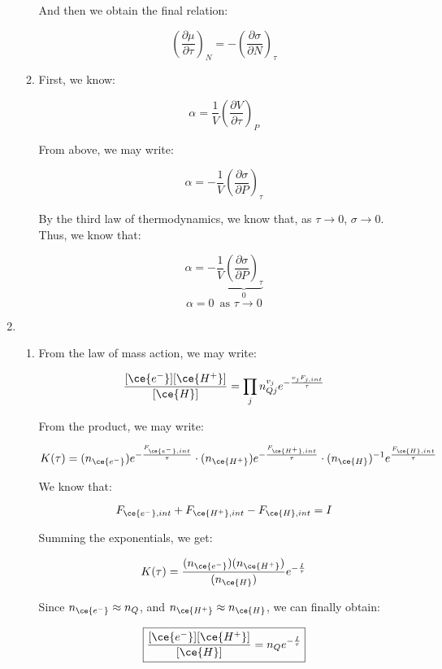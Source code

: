 \begin{enumerate}
\begin{enumerate}
        And then we obtain the final relation:

        $$\boxed{\left( \frac{\partial\mu}{\partial\tau} \right)_N=-\left( \frac{\partial\sigma}{\partial N} \right)_\tau}$$

      \item 

        First, we know:

        $$\alpha=\frac{1}{V}\left( \frac{\partial V}{\partial\tau} \right)_P$$

        From above, we may write:

        $$\alpha=-\frac{1}{V}\left( \frac{\partial \sigma}{\partial P} \right)_\tau$$

        By the third law of thermodynamics, we know that, as $\tau\to0$, $\sigma\to0$. Thus, we know that:

        $$\boxed{\alpha=-\frac{1}{V}\underbrace{\left( \frac{\partial \sigma}{\partial P} \right)_\tau}_0}$$
        $$\alpha=0\,\text{ as $\tau\to0$}$$

    \end{enumerate}

  \item

    \begin{enumerate}

      \item 

        From the law of mass action, we may write:

        $$\frac{[\ce{e^-}][\ce{H^+}]}{[\ce{H}]}=\prod_jn_{Qj}^{v_j}e^{-\frac{v_jF_{j,int}}{\tau}}$$

        From the product, we may write:

        $$K(\tau)=(n_{\ce{e^-}})e^{-\frac{F_{\ce{e^-},int}}{\tau}}\cdot(n_{\ce{H^+}})e^{-\frac{F_{\ce{H^+},int}}{\tau}}\cdot (n_{\ce{H}})^{-1}e^{\frac{F_{\ce{H},int}}{\tau}}$$

        We know that:

        $$F_{\ce{e^-},int}+F_{\ce{H^+},int}-F_{\ce{H},int}=I$$

        Summing the exponentials, we get:

        $$K(\tau)=\frac{(n_{\ce{e^-}})(n_{\ce{H^+}})}{(n_{\ce{H}})}e^{-\frac{I}{\tau}}$$

        Since $n_{\ce{e^-}}\approx n_Q$, and $n_{\ce{H^+}}\approx n_{\ce{H}}$, we can finally obtain:

        $$\boxed{\frac{[\ce{e^-}][\ce{H^+ }]}{[\ce{H}]}=n_Qe^{-\frac{I}{\tau}}}$$


\end{enumerate}
\end{enumerate}
